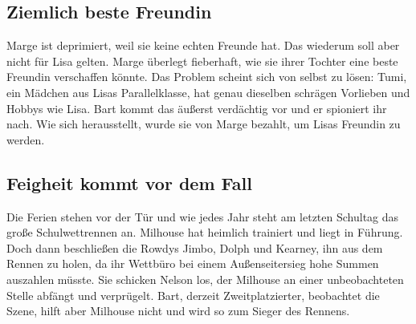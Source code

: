 
\subsection{Ziemlich beste Freundin}\label{SABF15}
Marge ist deprimiert, weil sie keine echten Freunde hat. Das wiederum soll aber nicht für Lisa gelten. Marge überlegt fieberhaft, wie sie ihrer Tochter eine beste Freundin verschaffen könnte. Das Problem scheint sich von selbst zu lösen: Tumi, ein Mädchen aus Lisas Parallelklasse, hat genau dieselben schrägen Vorlieben und Hobbys wie Lisa. Bart kommt das äußerst verdächtig vor und er spioniert ihr nach. Wie sich herausstellt, wurde sie von Marge bezahlt, um Lisas Freundin zu werden.


\subsection{Feigheit kommt vor dem Fall}\label{SABF18}
Die Ferien stehen vor der Tür und wie jedes Jahr steht am letzten Schultag das große Schulwettrennen an. Milhouse hat heimlich trainiert und liegt in Führung. Doch dann beschließen die Rowdys Jimbo, Dolph und Kearney, ihn aus dem Rennen zu holen, da ihr Wettbüro bei einem Außenseitersieg hohe Summen auszahlen müsste. Sie schicken Nelson los, der Milhouse an einer unbeobachteten Stelle abfängt und verprügelt. Bart, derzeit Zweitplatzierter, beobachtet die Szene, hilft aber Milhouse nicht und wird so zum Sieger des Rennens.


